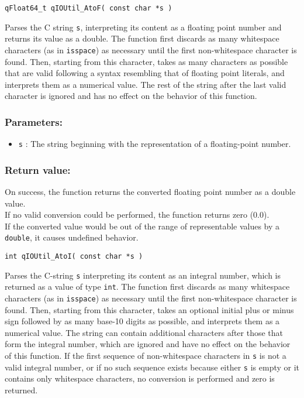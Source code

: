 \noindent\hrulefill

\begin{lstlisting}[style=CStyle]
qFloat64_t qIOUtil_AtoF( const char *s )
\end{lstlisting}

Parses the C string \lstinline{s}, interpreting its content as a floating point number and 
returns its value as a double. The function first discards as many whitespace 
characters (as in \lstinline{isspace}) as necessary until the first non-whitespace character is found. Then, starting from this character, takes as many characters as possible that are valid following a syntax resembling that of floating point literals, and 
interprets them as a numerical value. The rest of the string after the last valid 
character is ignored and has no effect on the behavior of this function. 

\subsubsection*{Parameters:}
\begin{itemize}
    \item \lstinline{s} : The string beginning with the representation of a floating-point number.
\end{itemize}

\subsubsection*{Return value:}
On success, the function returns the converted floating point number as  a double value. \\
If no valid conversion could be performed, the function returns zero (0.0). \\
If the converted value would be out of the range of representable values by a \lstinline{double}, it causes undefined behavior.


\noindent\hrulefill

\begin{lstlisting}[style=CStyle]
int qIOUtil_AtoI( const char *s )
\end{lstlisting}

Parses the C-string \lstinline{s} interpreting its content as an integral number, which is returned as a value of type \lstinline{int}. The function first discards as many whitespace characters (as in \lstinline{isspace}) as necessary until the first non-whitespace character is found. Then, starting from this character, takes an optional initial plus or minus sign followed by as many base-10 digits as possible, and interprets them as a numerical value. 
The string can contain additional characters after those that form the integral number, which are ignored and have no effect on the behavior of this function. If the first sequence of non-whitespace characters in \lstinline{s} is not a valid integral number, or if no such sequence exists because either \lstinline{s} is empty or it contains only whitespace characters, no conversion is performed and zero is returned.

